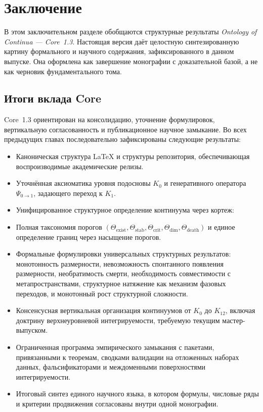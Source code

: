 
\section{Заключение}
\label{sec:conclusion}

В этом заключительном разделе обобщаются структурные результаты
\emph{Ontology of Continua --- Core~1.3}. Настоящая версия даёт целостную
синтезированную картину формального и научного содержания, зафиксированного в
данном выпуске. Она оформлена как завершение монографии с доказательной базой,
а не как черновик фундаментального тома.

\subsection{Итоги вклада Core}

Core~1.3 ориентирован на консолидацию, уточнение формулировок, вертикальную
согласованность и публикационное научное замыкание.
Во всех предыдущих главах последовательно зафиксированы следующие результаты:

\begin{itemize}
    \item Каноническая структура \LaTeX{} и структуры репозитория, обеспечивающая
          воспроизводимые академические релизы.
    \item Уточнённая аксиоматика уровня подосновы \(K_0\) и генеративного оператора
          \(\Psi_{0\to 1}\), задающего переход к \(K_1\).
    \item Унифицированное структурное определение континуума через кортеж:
          \\[
              K = \big(\Omega(K), A(K), P(t), J(t), \Theta(K), \partial\Omega(K), C(K), k(K,t)\big).
          \\]
    \item Полная таксономия порогов
          \((\Theta_{\mathrm{exist}}, \Theta_{\mathrm{stab}}, \Theta_{\mathrm{crit}},
            \Theta_{\mathrm{dim}}, \Theta_{\mathrm{death}})\)
          и единое определение границ через насыщение порогов.
    \item Формальные формулировки универсальных структурных результатов:
          монотонность размерности,
          невозможность спонтанного появления размерности,
          необратимость смерти,
          необходимость совместимости с метапространствами,
          структурное натяжение как механизм фазовых переходов,
          и монотонный рост структурной сложности.
    \item Консенсусная вертикальная организация континуумов от \(K_0\) до \(K_{12}\),
          включая доктрину верхнеуровневой интегрируемости, требуемую текущим
          мастер-выпуском.
    \item Ограниченная программа эмпирического замыкания с пакетами, привязанными к
          теоремам, сводками валидации на отложенных наборах данных, фальсификаторами
          и междоменными поверхностями интегрируемости.
    \item Итоговый синтез единого научного языка, в котором формулы, числовые ряды и
          критерии продвижения согласованы внутри одной монографии.
\end{itemize}

